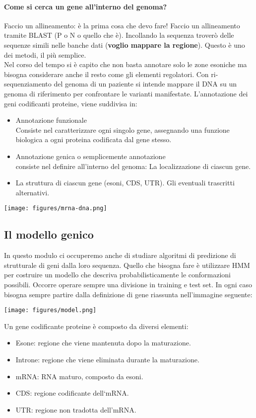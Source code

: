 \documentclass{article}
\begin{document}
\paragraph{Come si cerca un gene all'interno del genoma?}
Faccio un allineamento: è la prima cosa che devo fare! Faccio un allineamento tramite BLAST (P o N o quello che è). Incollando la sequenza troverò delle sequenze simili nelle banche dati (\textbf{voglio mappare la regione}). Questo è uno dei metodi, il più semplice.\\

Nel corso del tempo si è capito che non basta annotare solo le zone esoniche ma bisogna considerare anche il resto come gli elementi regolatori.
Con ri-sequenziamento del genoma di un paziente si intende mappare il DNA su un genoma di riferimento per confrontare le varianti manifestate.
L'annotazione dei geni codificanti proteine, viene suddivisa in:
\begin{itemize}
    \item Annotazione funzionale\\Consiste nel caratterizzare ogni
    singolo gene, assegnando una funzione biologica a ogni proteina
    codificata dal gene stesso.
    \item Annotazione genica o semplicemente annotazione\\ consiste
    nel definire all'interno del genoma:
        \subitem{-} La localizzazione di ciascun gene. \item La struttura di ciascun gene (esoni,
        CDS, UTR).
        \subitem{-} Gli eventuali trascritti alternativi.
\end{itemize}
\begin{center}
    \texttt{[image: figures/mrna-dna.png]}
\end{center}
\subsection{Il modello genico}
In questo modulo ci occuperemo anche di studiare algoritmi di predizione di strutturale di geni dalla loro sequenza. Quello che bisogna fare è utilizzare HMM per costruire un modello che descriva probabilisticamente le conformazioni possibili.
Occorre operare sempre una divisione in training e test set. In ogni caso bisogna sempre partire dalla definizione di gene riassunta nell'immagine seguente:
\begin{center}
    \texttt{[image: figures/model.png]}
\end{center}
Un gene codificante proteine è composto da diversi elementi:
\begin{itemize}
    \item Esone: regione che viene mantenuta dopo la maturazione.
    \item Introne: regione che viene eliminata durante la maturazione.
    \item mRNA: RNA maturo, composto da esoni.
    \item CDS: regione codificante dell‘mRNA.
    \item UTR: regione non tradotta dell'mRNA.
\end{itemize}
\end{document}
